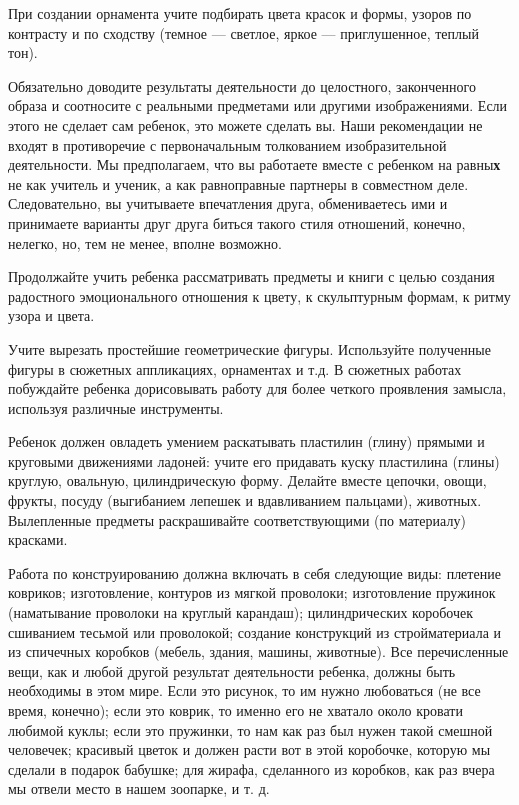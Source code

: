 \documentclass{book}
\begin{document}
При создании орнамента учите подбирать цвета красок и формы, узоров по
контрасту и по сходству (темное --- светлое, яркое --- приглушенное,
теплый тон).

Обязательно доводите результаты деятельности до целостного, законченного
образа и соотносите с реальными предметами или другими изображениями.
Если этого не сделает сам ребенок, это можете сделать вы. Наши
рекомендации не входят в противоречие с первоначальным толкованием
изобразительной деятельности. Мы предполагаем, что вы работаете вместе с
ребенком на равны\textbf{х} не как учитель и ученик, а как равноправные
партнеры в совместном деле. Следовательно, вы учитываете впечатления
друга, обмениваетесь ими и принимаете варианты друг друга биться такого
стиля отношений, конечно, нелегко, но, тем не менее, вполне возможно.

Продолжайте учить ребенка рассматривать предметы и книги с целью
создания радостного эмоционального отношения к цвету, к скульптурным
формам, к ритму узора и цвета.

Учите вырезать простейшие геометрические фигуры. Используйте полученные
фигуры в сюжетных аппликациях, орнаментах и т.д. В сюжетных работах
побуждайте ребенка дорисовывать работу для более четкого проявления
замысла, используя различные инструменты.

Ребенок должен овладеть умением раскатывать пластилин (глину) прямыми и
круговыми движениями ладоней: учите его придавать куску пластилина
(глины) круглую, овальную, цилиндрическую форму. Делайте вместе цепочки,
овощи, фрукты, посуду (выгибанием лепешек и вдавливанием пальцами),
животных. Вылепленные предметы раскрашивайте соответствующими (по
материалу) красками.

Работа по конструированию должна включать в себя следующие виды:
плетение ковриков; изготовление, контуров из мягкой проволоки;
изготовление пружинок (наматывание проволоки на круглый карандаш);
цилиндрических коробочек сшиванием тесьмой или проволокой; создание
конструкций из стройматериала и из спичечных коробков (мебель, здания,
машины, животные). Все перечисленные вещи, как и любой другой результат
деятельности ребенка, должны быть необходимы в этом мире. Если это
рисунок, то им нужно любоваться (не все время, конечно); если это
коврик, то именно его не хватало около кровати любимой куклы; если это
пружинки, то нам как раз был нужен такой смешной человечек; красивый
цветок и должен расти вот в этой коробочке, которую мы сделали в подарок
бабушке; для жирафа, сделанного из коробков, как раз вчера мы отвели
место в нашем зоопарке, и т. д.
\end{document}
